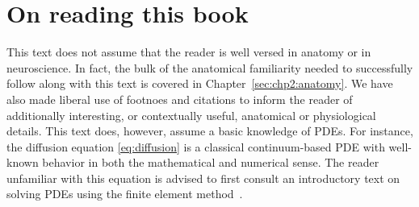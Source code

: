 %


\section{On reading this book}
This text does not assume that the reader is well versed in anatomy or in 
neuroscience.  In fact, the bulk of the anatomical familiarity needed to 
successfully follow along with this text is covered in 
Chapter~\ref{sec:chp2:anatomy}.  We have also made liberal use of footnoes and 
citations to inform the reader of additionally interesting, or contextually 
useful, anatomical or physiological details. This text does, however, assume a 
basic knowledge of PDEs. For instance, the diffusion equation 
\eqref{eq:diffusion} is a classical continuum-based PDE with well-known 
behavior in both the mathematical and numerical sense. The reader unfamiliar 
with this equation is advised to first consult an introductory text on solving 
PDEs using the finite element
method~\cite{gockenbach2006understanding,
  langtangen2016solving, langtangen2019introduction,tveito2004introduction}.

